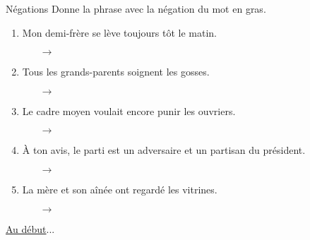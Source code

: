 \begin{frame}{Négations}
  Donne la phrase avec la négation du mot \alert{en gras}.
  \begin{enumerate}
    \item Mon demi-frère se lève \alert{toujours} tôt le matin.
    \begin{itemize}
      \item[$\to$] 
    \end{itemize}
    \item \alert{Tous les grands-parents} soignent les gosses.
    \begin{itemize}
      \item[$\to$] 
    \end{itemize}
    \item Le cadre moyen voulait \alert{encore} punir les ouvriers.
    \begin{itemize}
      \item[$\to$] 
    \end{itemize}
    \item À ton avis, le parti est un adversaire et un partisan du président.
    \begin{itemize}
      \item[$\to$] 
    \end{itemize}
    \item La mère et son aînée ont regardé \alert{les vitrines}.
    \begin{itemize}
      \item[$\to$] 
    \end{itemize}
  \end{enumerate}
  \vspace{0.25cm}
  \raggedleft\raggedleft\hyperlink{début}{Au début}...
\end{frame}